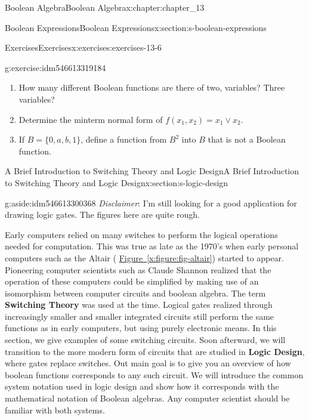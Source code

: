 \documentclass[oneside,10pt,]{book}
\newcommand{\xreffont}{\relax}
\newcommand{\terminology}[1]{\textbf{#1}}
\numberwithin{equation}{section}
\begin{document}
\begin{chapterptx}{Boolean Algebra}{}{Boolean Algebra}{}{}{x:chapter:chapter_13}
\begin{sectionptx}{Boolean Expressions}{}{Boolean Expressions}{}{}{x:section:s-boolean-expressions}
\begin{exercises-subsection}{Exercises}{}{Exercises}{}{}{x:exercises:exercises-13-6}
\begin{divisionexercise}{3}{}{}{g:exercise:idm546613319184}
\begin{enumerate}[label=(\alph*)]
\item{}How many different Boolean functions are there of two, variables? Three variables?%
\item{}Determine the minterm normal form of \(f\left(x_1, x_2\right)=x_1\lor x_2\).%
\item{}If \(B=\{0, a, b, 1\}\), define a function from \(B^2\) into \(B\) that is not a Boolean function.%
\end{enumerate}
%
\end{divisionexercise}%
\end{exercises-subsection}
\end{sectionptx}
%
%
\typeout{************************************************}
\typeout{************************************************}
%
\begin{sectionptx}{A Brief Introduction to Switching Theory and Logic Design}{}{A Brief Introduction to Switching Theory and Logic Design}{}{}{x:section:s-logic-design}
%
%
\begin{aside}{}{g:aside:idm546613300368}%
\emph{Disclaimer}:  I'm still looking for a good application for drawing logic gates.  The figures here are quite rough.%
\end{aside}
Early computers relied on many switches to perform the logical operations needed for computation.  This was true as late as the 1970's when early personal computers such as the Altair ( \hyperref[x:figure:fig-altair]{Figure~{\xreffont\ref{x:figure:fig-altair}}}) started to appear. Pioneering computer scientists such as Claude Shannon realized that the operation of these computers could be simplified by making use of an isomorphism between computer circuits and boolean algebra.   The term \terminology{Switching Theory} was used at the time.  Logical gates realized through increasingly smaller and smaller integrated circuits still perform the same functions as in early computers, but using purely electronic means.  In this section, we give examples of some switching circuits.  Soon afterward, we will transition to the more modern form of circuits that are studied in \terminology{Logic Design}, where gates replace switches.  Out main goal is to give you an overview of how boolean functions corresponds to any such circuit.  We will introduce the common system notation used in logic design and show how it corresponds with the mathematical notation of Boolean algebras.  Any computer scientist should be familiar with both systems.%

\end{sectionptx}
\end{chapterptx}
\end{document}
